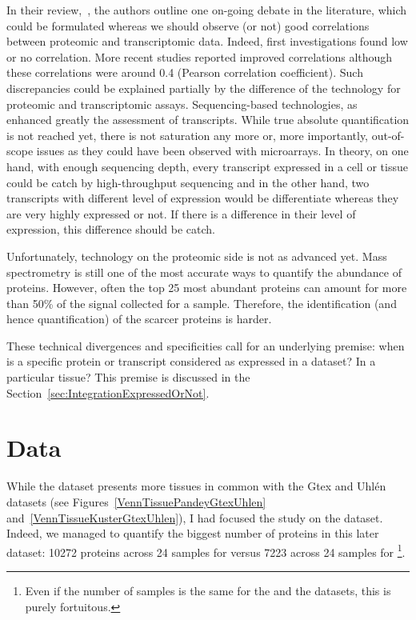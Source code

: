 In their review,~\cite{Uhlen:2016}, the authors outline one on-going debate
in the literature, which could be formulated whereas we should observe (or not)
good correlations between proteomic and transcriptomic data.
Indeed, first investigations found low or no correlation. More recent
studies reported improved correlations although these correlations were around
0.4 (Pearson correlation coefficient). Such discrepancies could be explained
partially by the difference of the technology for proteomic and transcriptomic
assays. Sequencing-based technologies, as \Rnaseq\, enhanced greatly the
assessment of transcripts. While true absolute quantification is not reached yet,
there is not saturation any more or, more importantly, out-of-scope issues as
they could have been observed with microarrays. In theory, on one hand, with
enough sequencing depth, every transcript expressed in a cell or tissue could be
catch by high-throughput sequencing and in the other hand, two transcripts with
different level of expression would be differentiate whereas they are very highly
expressed or not. If there is a difference in their level of expression, this
difference should be catch.

Unfortunately, technology on the proteomic side is not as advanced yet.
Mass spectrometry is still one of the most accurate ways to quantify the
abundance of proteins. However, often the top 25 most abundant proteins can
amount for more than 50\% of the signal collected for a sample. Therefore, the
identification (and hence quantification) of the scarcer proteins is harder.


These technical divergences and specificities call for an underlying premise:
when is a specific protein or transcript considered as expressed in a dataset?
In a particular tissue? This premise is discussed
in the Section~\ref{sec:IntegrationExpressedOrNot}.



\section{Data}
\label{sec:IntegrationData}

While the  dataset presents more tissues in common
with the Gtex and Uhlén datasets (see Figures~\ref{VennTissuePandeyGtexUhlen}
and~\ref{VennTissueKusterGtexUhlen}), I had focused the study on
the  dataset. Indeed, we managed to quantify the biggest number
of proteins in this later dataset: 10272 proteins across 24 samples for
 versus 7223 across 24 samples for \footnote{Even
if the number of samples is the same for the  and
the  datasets, this is purely fortuitous.}.

